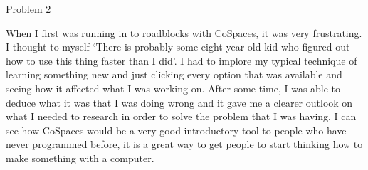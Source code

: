 \begin{problem}{Problem 2}
\begin{Highlight}[Response]
        When I first was running in to roadblocks with CoSpaces, it was very frustrating. I thought to myself `There is probably some eight year old kid who figured out how to use this thing faster than I did'.
        I had to implore my typical technique of learning something new and just clicking every option that was available and seeing how it affected what I was working on. After some time, I was able to deduce
        what it was that I was doing wrong and it gave me a clearer outlook on what I needed to research in order to solve the problem that I was having. I can see how CoSpaces would be a very good introductory
        tool to people who have never programmed before, it is a great way to get people to start thinking how to make something with a computer.
    \end{Highlight}
\end{problem}

